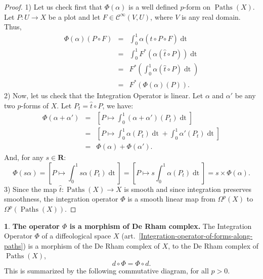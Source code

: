 \documentclass[11pt,reqno]{amsart}
\theoremstyle{definition}
\newtheorem{article}{}
\newcommand{\artlabel}[1]{{\bf #1.}}
\newcommand{\RR}{{\mathbf R}}
\def \F{{F}}
\def \P{{P}}
\def \U{{U}}
\def \V{{V}}
\def \X{{X}}
\newcommand{\cC}{{\mathcal C}}
\newcommand{\art}[1]{{(art.~\ref{#1})}}
\newcommand{\DForms}{\Omega}
\newcommand{\Paths}{\operatorname{Paths}}
\newcommand{\Cinf}{{\cC}^\infty}
\newcommand{\dt}{\operatorname{dt}}
\begin{document}
  \begin{proof} 1) Let us check first that $\Phi(\alpha)$
    is a well defined $p$-form on $\Paths(\X)$. Let $\P:
      \U \to \X$ be a plot and let $\F \in \Cinf(\V,
        \U)$, where $\V$ is any real domain. Thus,
    \begin{eqnarray*}
      \Phi(\alpha)(\P \circ \F) & = &
      \int_0^1\alpha({\hat t} \circ \P \circ \F) \dt \\
      & = & \int_0^1 \F^*(\alpha({\hat t} \circ \P)) \dt \\  
      & = & \F^*\left(\int_0^1 \alpha({\hat t} \circ
      \P) \dt \right) \\  & = & \F^*(\Phi(\alpha)(\P)).
    \end{eqnarray*}
    2) Now, let us check that the Integration
    Operator is linear. Let $\alpha$ and $\alpha'$ be
    any two $p$-forms of $\X$. Let $\P_t = {\hat t} \circ \P$, we have:
    \begin{eqnarray*}
      \Phi(\alpha + \alpha') & = & [\P \mapsto 
      \int_0^1 (\alpha + \alpha')(\P_t) \dt] \\ 
      & = & [\P \mapsto \int_0^1 \alpha(\P_t) \dt + \int_0^1 \alpha'(\P_t) \dt] \\ 
      & = & \Phi(\alpha) + \Phi(\alpha').
    \end{eqnarray*}
    And, for any $s \in \RR$:  $$\Phi(s\alpha) = [ \P
      \mapsto  \int_0^1 s\alpha(\P_t) \dt]
      = [\P \mapsto  s \int_0^1 \alpha(\P_t) \dt]
      = s\times \Phi(\alpha).
      $$
    3) Since the map ${\hat t}: \Paths(\X) \to \X$ is
    smooth and since integration preserves smoothness, the
    integration operator $\Phi$ is a smooth linear map from
    $\DForms^p(\X)$ to $\DForms^p(\Paths(\X))$.
  \end{proof}
  
  \begin{article}\artlabel{The operator $\Phi$ is a morphism of De Rham complex} 
    \label{The-operator-Phi-is-a-morphism-of-De-Rham-complex}
    The In\-te\-gr\-a\-tion Operator
    $\Phi$ of a diffeological space $\X$
    \art{Integration-operator-of-forms-along-paths} is a morphism of the
    De Rham complex of $\X$, to the De Rham complex of
    $\Paths(\X)$,
    $$
      d \circ \Phi = \Phi
      \circ d.$$
    This is summarized by the following
    commutative diagram, for all $p>0$. 
  \begin{center}
\end{center}
  \end{article} %
  
\end{document}
